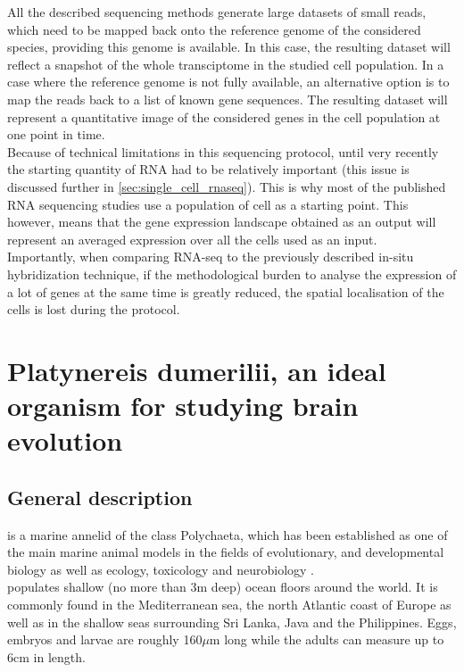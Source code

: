     All the described sequencing methods generate large datasets of small reads, which need to be mapped back onto the reference genome of the considered species, providing this genome is available. In this case, the resulting dataset will reflect a snapshot of the whole transciptome in the studied cell population. In a case where the reference genome is not fully available, an alternative option is to map the reads back to a list of known gene sequences. The resulting dataset will represent a quantitative image of the considered genes in the cell population at one point in time.\\
    
    Because of technical limitations in this sequencing protocol, until very recently the starting quantity of RNA had to be relatively important (this issue is discussed further in \ref{sec:single_cell_rnaseq}). This is why most of the published RNA sequencing studies use a population of cell as a starting point. This however, means that the gene expression landscape obtained as an output will represent an averaged expression over all the cells used as an input.\\
    
    Importantly, when comparing RNA-seq to the previously described in-situ hybridization technique, if the methodological burden to analyse the expression of a lot of genes at the same time is greatly reduced, the spatial localisation of the cells is lost during the protocol.\\
    
    
\section{Platynereis dumerilii, an ideal organism for studying brain evolution}\label{sec:platynereis}
     \subsection{General description}
     \platyfull{} is a marine annelid of the class Polychaeta, which has been established as one of the main marine animal models in the fields of evolutionary, and developmental biology as well as ecology, toxicology and neurobiology \cite{hutchinson95,tessmar03,hardege99,dorresteijn90,fischer04,Fischer10}.\\
     
     \platy{} populates shallow (no more than 3m deep) ocean floors around the world. It is commonly found in the Mediterranean sea, the north Atlantic coast of Europe as well as in the shallow seas surrounding Sri Lanka, Java and the Philippines. Eggs, embryos and larvae are roughly 160$\mu$m long while the adults can measure up to 6cm in length.
     
